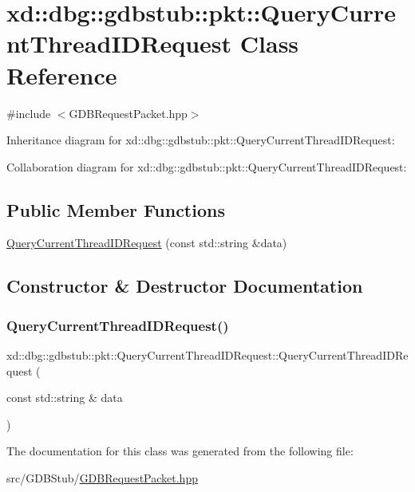 \hypertarget{classxd_1_1dbg_1_1gdbstub_1_1pkt_1_1_query_current_thread_i_d_request}{}\section{xd\+:\+:dbg\+:\+:gdbstub\+:\+:pkt\+:\+:Query\+Current\+Thread\+I\+D\+Request Class Reference}
\label{classxd_1_1dbg_1_1gdbstub_1_1pkt_1_1_query_current_thread_i_d_request}


{\ttfamily \#include $<$G\+D\+B\+Request\+Packet.\+hpp$>$}



Inheritance diagram for xd\+:\+:dbg\+:\+:gdbstub\+:\+:pkt\+:\+:Query\+Current\+Thread\+I\+D\+Request\+:


Collaboration diagram for xd\+:\+:dbg\+:\+:gdbstub\+:\+:pkt\+:\+:Query\+Current\+Thread\+I\+D\+Request\+:
\subsection*{Public Member Functions}
\begin{DoxyCompactItemize}
\item 
\mbox{\hyperlink{classxd_1_1dbg_1_1gdbstub_1_1pkt_1_1_query_current_thread_i_d_request_a5fc390cd6d763726ad18b4a66fed2ba3}{Query\+Current\+Thread\+I\+D\+Request}} (const std\+::string \&data)
\end{DoxyCompactItemize}


\subsection{Constructor \& Destructor Documentation}
\mbox{\label{classxd_1_1dbg_1_1gdbstub_1_1pkt_1_1_query_current_thread_i_d_request_a5fc390cd6d763726ad18b4a66fed2ba3}} 
\subsubsection{\texorpdfstring{Query\+Current\+Thread\+I\+D\+Request()}{QueryCurrentThreadIDRequest()}}
{\footnotesize\ttfamily xd\+::dbg\+::gdbstub\+::pkt\+::\+Query\+Current\+Thread\+I\+D\+Request\+::\+Query\+Current\+Thread\+I\+D\+Request (\begin{DoxyParamCaption}\item[{const std\+::string \&}]{data }\end{DoxyParamCaption})\hspace{0.3cm}{\ttfamily [inline]}}



The documentation for this class was generated from the following file\+:\begin{DoxyCompactItemize}
\item 
src/\+G\+D\+B\+Stub/\mbox{\hyperlink{_g_d_b_request_packet_8hpp}{G\+D\+B\+Request\+Packet.\+hpp}}\end{DoxyCompactItemize}
